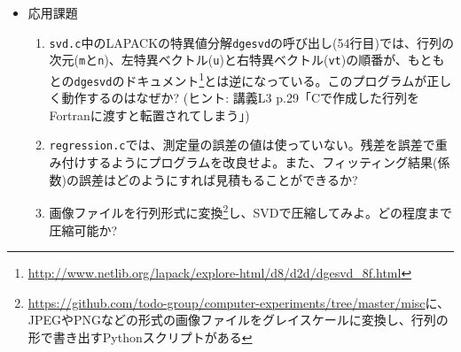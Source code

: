 \documentclass[11pt]{jarticle}
\begin{document}
\begin{itemize}
\item 応用課題
  \begin{enumerate}
  \item {\tt svd.c}中のLAPACKの特異値分解{\tt dgesvd}の呼び出し(54行目)では、行列の次元({\tt m}と{\tt n})、左特異ベクトル({\tt u})と右特異ベクトル({\tt vt})の順番が、もともとの{\tt dgesvd}のドキュメント\footnote{\url{http://www.netlib.org/lapack/explore-html/d8/d2d/dgesvd_8f.html}}とは逆になっている。このプログラムが正しく動作するのはなぜか? (ヒント: 講義L3 p.29「Cで作成した行列をFortranに渡すと転置されてしまう」)
  \item {\tt regression.c}では、測定量の誤差の値は使っていない。残差を誤差で重み付けするようにプログラムを改良せよ。また、フィッティング結果(係数)の誤差はどのようにすれば見積もることができるか?
  \item 画像ファイルを行列形式に変換\footnote{\url{https://github.com/todo-group/computer-experiments/tree/master/misc}に、JPEGやPNGなどの形式の画像ファイルをグレイスケールに変換し、行列の形で書き出すPythonスクリプトがある}し、SVDで圧縮してみよ。どの程度まで圧縮可能か?
  \end{enumerate}  
\end{itemize}
\end{document}
